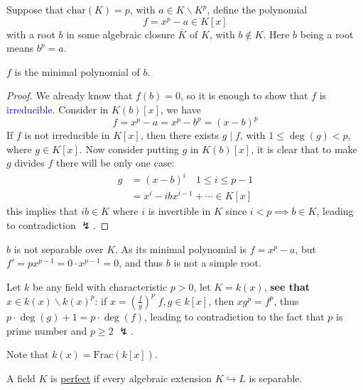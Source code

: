 \begin{eg}
	Suppose that \( \text{char}(K) = p \), with \( a \in K \smallsetminus K^p \), define the polynomial
	\[
		f = x^p - a \in K[x]
	\]
	with a root \( b \) in some algebraic closure \( \overline{K} \) of \( K \), with \( b \not\in K \). Here
	\( b \) being a root means \( b^p = a \).
	\begin{claim}
		\( f \) is the minimal polynomial of \( b \).
	\end{claim}
	\begin{proof}
		We already know that \( f(b) = 0 \), so it is enough to show that \( f \) is \textcolor{blue}{irreducible}.
		Consider in \( K(b)[x] \), we have
		\[
			f = x^p - a = x^p - b^p = (x-b)^p
		\]
		If \( f \) is not irreducible in \( K[x] \), then there exists \( g \mid f \), with \( 1 \leq \deg(g) < p \),
		where \( g \in K[x] \). Now consider putting \( g \) in \( K(b)[x] \), it is clear that to make
		\( g \) divides \( f \) there will be only one case:
		\[
			\begin{aligned}
				g & = (x-b)^i \quad 1 \leq i \leq p-1    \\
				  & = x^i - ib x^{i-1} + \cdots \in K[x]
			\end{aligned}
		\]
		this implies that \( ib \in K \) where \( i \) is invertible in \( K \) since \( i < p \implies b \in K \),
		leading to contradiction \( \lightning \).
	\end{proof}

	\begin{conclusion}
		\( b \) is not separable over \( K \). As its minimal polynomial is \( f = x^p - a \), but \( f'
		= px^{p-1} = 0 \cdot x^{p-1}= 0\), and thus \( b \) is not a simple root.
	\end{conclusion}
\end{eg}

\begin{eg}
	\label{eg:explicit-example}
	Let \( k \) be any field with characteristic \( p > 0 \), let \( K = k(x) \), \textbf{see that} \( x \in
	k(x)\smallsetminus k(x)^p \): if \( x = (\frac{f}{g})^p \; f,g \in k[x] \), then \( xg^p = f^p \), thus
	\( p\cdot \deg(g) + 1 = p\cdot \deg(f) \), leading to contradiction to the fact that \( p \) is prime number and \( p \geq 2 \) \( \lightning \).
	\begin{note}
		Note that \( k(x) = \text{Frac}(k[x]) \).
	\end{note}
\end{eg}

\begin{definition}
	A field \( K \) is \underline{perfect} if every algebraic extension \( K \hookrightarrow L \) is separable.
\end{definition}

